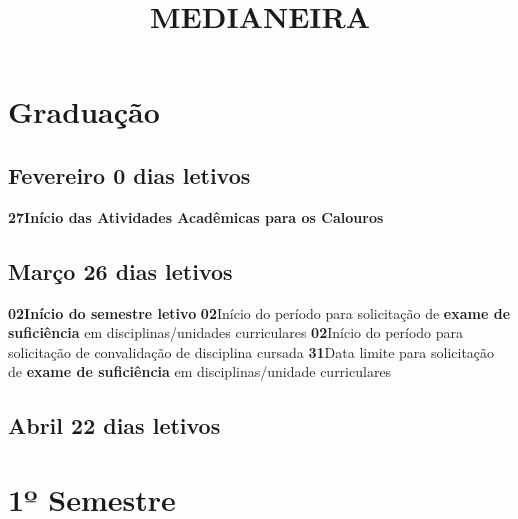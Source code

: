 \documentclass[thesis]{hmcposter}
\author{ }
\title{MEDIANEIRA}
\begin{document}
\begin{poster}
\normalsize\section{\color{hmcorange}Graduação}\subsection{Fevereiro \hfill 0 dias letivos}\textbf{27}\qquad \textbf{Início das Atividades Acadêmicas para os Calouros} \newline \null\subsection{Março \hfill 26 dias letivos}\textbf{02}\qquad \textbf{Início do semestre letivo} \newline \null\textbf{02}\qquad Início do período para solicitação de \textbf{exame de suficiência} em disciplinas/unidades curriculares \newline \null\textbf{02}\qquad Início do período para solicitação de convalidação de disciplina cursada \newline \null\textbf{31}\qquad Data limite para solicitação de \textbf{exame de suficiência} em disciplinas/unidade curriculares \newline \null\subsection{Abril \hfill 22 dias letivos}\vfill\null
\columnbreak
\section{\hfill \color{hmcorange}1º Semestre}

\end{poster}
\end{document}
